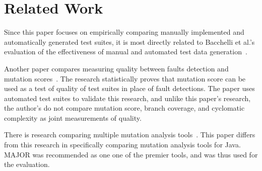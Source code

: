 
\section{Related Work} \label{sec:related_work}

Since this paper focuses on empirically comparing manually implemented and automatically generated test suites, it is
most directly related to Bacchelli et al.'s evaluation of the effectiveness of manual and automated test data
generation~\cite{bacchelli2008}.


Another paper compares measuring quality between faults detection and mutation scores~\cite{just2014}. The research statistically proves that mutation score can be used as a test of quality of test suites in place of fault detections.  The paper uses automated test suites to validate this research, and unlike this paper's research, the author's do not compare mutation score, branch coverage, and cyclomatic complexity as joint measurements of quality. 

There is research comparing multiple mutation analysis tools~\cite{ComparingAutomatedMutationTools:2013}. This paper differs from this research in specifically comparing mutation analysis tools for Java. MAJOR was recommended as one one of the premier tools, and was thus used for the evaluation.
